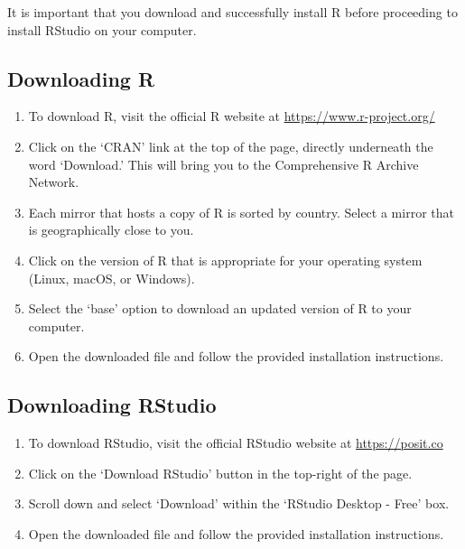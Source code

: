 \documentclass[
  letterpaper,
]{krantz}
\providecommand{\tightlist}{%
  \setlength{\itemsep}{0pt}\setlength{\parskip}{0pt}}\usepackage{longtable,booktabs,array}
\begin{document}
\begin{tcolorbox}[enhanced jigsaw, colback=white, leftrule=.75mm, breakable, colframe=quarto-callout-important-color-frame, bottomtitle=1mm, rightrule=.15mm, left=2mm, opacityback=0, bottomrule=.15mm, arc=.35mm, coltitle=black, colbacktitle=quarto-callout-important-color!10!white, toptitle=1mm, titlerule=0mm, title=\textcolor{quarto-callout-important-color}{\faExclamation}\hspace{0.5em}{Important}, toprule=.15mm, opacitybacktitle=0.6]

It is important that you download and successfully install R before
proceeding to install RStudio on your computer.

\end{tcolorbox}

\hypertarget{downloading-r}{%
\subsection{Downloading R}\label{downloading-r}}

\begin{enumerate}
\def\labelenumi{\arabic{enumi}.}
\tightlist
\item
  To download R, visit the official R website at
  \url{https://www.r-project.org/}
\item
  Click on the `CRAN' link at the top of the page, directly underneath
  the word `Download.' This will bring you to the Comprehensive R
  Archive Network.
\item
  Each mirror that hosts a copy of R is sorted by country. Select a
  mirror that is geographically close to you.
\item
  Click on the version of R that is appropriate for your operating
  system (Linux, macOS, or Windows).
\item
  Select the `base' option to download an updated version of R to your
  computer.
\item
  Open the downloaded file and follow the provided installation
  instructions.
\end{enumerate}

\hypertarget{downloading-rstudio}{%
\subsection{Downloading RStudio}\label{downloading-rstudio}}

\begin{enumerate}
\def\labelenumi{\arabic{enumi}.}
\tightlist
\item
  To download RStudio, visit the official RStudio website at
  \url{https://posit.co}
\item
  Click on the `Download RStudio' button in the top-right of the page.
\item
  Scroll down and select `Download' within the `RStudio Desktop - Free'
  box.
\item
  Open the downloaded file and follow the provided installation
  instructions.
\end{enumerate}
\end{document}
